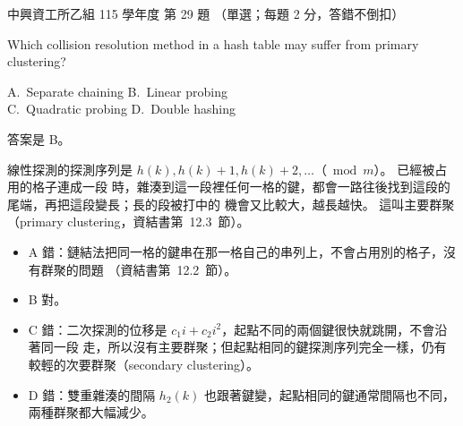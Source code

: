 \begin{pastexam}[label={px:nchu-115-is-29}]{中興資工所乙組 115 學年度 第 29 題}
（單選；每題 2 分，答錯不倒扣）

Which collision resolution method in a hash table may suffer from primary clustering?

A.~Separate chaining \qquad B.~Linear probing\\
C.~Quadratic probing \qquad D.~Double hashing
\end{pastexam}

\begin{pastsoln}
答案是 B。

線性探測的探測序列是 $h(k), h(k) + 1, h(k) + 2, \ldots$（$\bmod m$）。 已經被占用的格子連成一段
時，雜湊到這一段裡任何一格的鍵，都會一路往後找到這段的尾端，再把這段變長；長的段被打中的
機會又比較大，越長越快。 這叫主要群聚（primary clustering，資結書第~12.3~節）。
\begin{itemize}
\item A 錯：鏈結法把同一格的鍵串在那一格自己的串列上，不會占用別的格子，沒有群聚的問題
（資結書第~12.2~節）。
\item B 對。
\item C 錯：二次探測的位移是 $c_1 i + c_2 i^2$，起點不同的兩個鍵很快就跳開，不會沿著同一段
走，所以沒有主要群聚；但起點相同的鍵探測序列完全一樣，仍有較輕的次要群聚（secondary
clustering）。
\item D 錯：雙重雜湊的間隔 $h_2(k)$ 也跟著鍵變，起點相同的鍵通常間隔也不同，兩種群聚都大幅減少。
\end{itemize}
\end{pastsoln}
